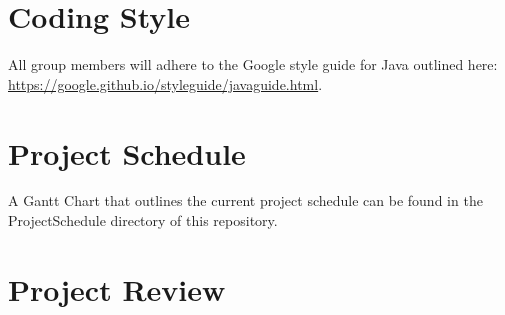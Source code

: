 \documentclass{article}
\begin{document}
\section{Coding Style}
All group members will adhere to the Google style guide for Java outlined here: \url{https://google.github.io/styleguide/javaguide.html}.


\section{Project Schedule}
A Gantt Chart that outlines the current project schedule can be found in the ProjectSchedule directory of this repository.

\section{Project Review}
\end{document}
